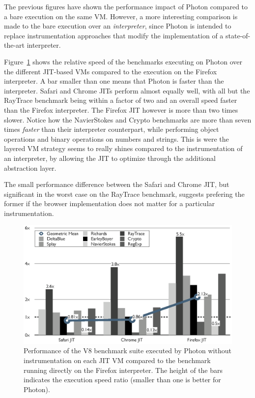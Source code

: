 The previous figures have shown the performance impact of Photon compared to a
bare execution on the same VM. However, a more interesting comparison is made
to the bare execution over an \textit{interpreter}, since Photon is intended to
replace instrumentation approaches that modify the implementation of a
state-of-the-art interpreter.

Figure~\ref{fig:perf-no-instrumentation-photon-vs-interpreter} shows the
relative speed of the benchmarks executing on Photon over the different
JIT-based VMs compared to the execution on the Firefox interpreter. A bar
smaller than one means that Photon is faster than the interpreter. Safari and
Chrome JITs perform almost equally well, with all but the RayTrace benchmark
being within a factor of two and an overall speed faster than the Firefox
interpreter. The Firefox JIT however is more than two times slower. Notice how
the NavierStokes and Crypto benchmarks are more than seven times \textit{faster}
than their interpreter counterpart, while performing object operations and
binary operations on numbers and strings. This is were the layered VM strategy
seems to really shines compared to the instrumentation of an interpreter, by
allowing the JIT to optimize through the additional abstraction layer.

The small performance difference between the Safari and Chrome JIT, but
significant in the worst case on the RayTrace benchmark, suggests prefering the
former if the browser implementation does not matter for a particular
instrumentation.



\begin{figure}[htbp]
\begin{center}
\includegraphics[width=.85\textwidth]{figures/ComparisonToInterpreter}
\caption[Performance of the V8 benchmark suite executed by Photon without instrumentation]{Performance of the V8 benchmark suite executed by Photon without instrumentation
on each JIT VM compared to the benchmark running directly on the Firefox interpreter.  The height of the bars
indicates the execution speed ratio (smaller than one is better for Photon).}
\label{fig:perf-no-instrumentation-photon-vs-interpreter}
\end{center}
\end{figure}

